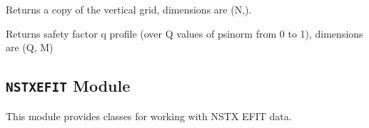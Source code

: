 \documentclass[letterpaper,10pt,english]{sphinxmanual}
\begin{document}
\begin{fulllineitems}
\begin{fulllineitems}
\label{eqtools:eqtools.FromArrays.ArrayEquilibrium.getZGrid}
Returns a copy of the vertical grid, dimensions are (N,).

\end{fulllineitems}


\begin{fulllineitems}
\label{eqtools:eqtools.FromArrays.ArrayEquilibrium.getQProfile}
Returns safety factor q profile (over Q values of psinorm from 0 to 1),
dimensions are (Q, M)

\end{fulllineitems}


\end{fulllineitems}



\subsection{\texttt{NSTXEFIT} Module}
\label{eqtools:module-eqtools.NSTXEFIT}\label{eqtools:nstxefit-module}
This module provides classes for working with NSTX EFIT data.
\end{document}
